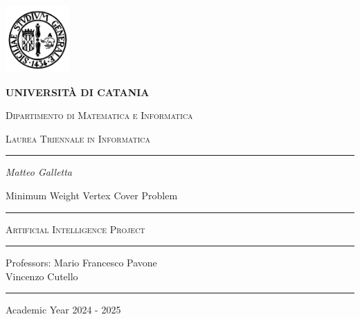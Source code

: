 \begin{titlepage}
\centering
\includegraphics[width=2.434cm,height=2.565cm]{images/university_logo.png}

\bigskip

{\Large \textbf{UNIVERSITÀ DI CATANIA}}

{\scshape
\large
Dipartimento di Matematica e Informatica
}

{\scshape
\normalsize
Laurea Triennale in Informatica
}

\bigskip


\hrule


\bigskip


\bigskip


\bigskip


\bigskip

{\itshape
\large
Matteo Galletta
\par}


\bigskip


\bigskip


\bigskip


\bigskip

{\centering
\Large
Minimum Weight Vertex Cover Problem
\par}


\bigskip


\bigskip


\bigskip


\bigskip


\bigskip


\bigskip


\begin{minipage}[b]{8 cm}
\hrule

\bigskip

{\centering\scshape
Artificial Intelligence Project
\par}


\bigskip

\hrule
\end{minipage}
\bigskip


\bigskip


\bigskip


\bigskip


\bigskip


\bigskip


\bigskip


\bigskip


\bigskip


\bigskip


\bigskip

{\raggedleft
Professors: Mario Francesco Pavone \\
Vincenzo Cutello
\par}


\bigskip


\bigskip


\bigskip


\bigskip

\hrule

\bigskip

{\centering
Academic Year 2024 - 2025
\par}
\end{titlepage}
